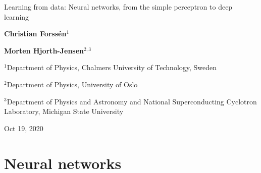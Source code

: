 \documentclass[%
oneside,                 %
final,                   %
10pt]{article}
\begin{document}

\newcommand{\exercisesection}[1]{\subsection*{#1}}







\thispagestyle{empty}

\begin{center}
{\LARGE\bf
\begin{spacing}{1.25}
Learning from data: Neural networks, from the simple perceptron to deep learning
\end{spacing}
}
\end{center}


\begin{center}
{\bf Christian Forssén${}^{1}$} \\ [0mm]
\end{center}


\begin{center}
{\bf Morten Hjorth-Jensen${}^{2, 3}$} \\ [0mm]
\end{center}

\begin{center}
\centerline{{\small ${}^1$Department of Physics, Chalmers University of Technology, Sweden}}
\centerline{{\small ${}^2$Department of Physics, University of Oslo}}
\centerline{{\small ${}^3$Department of Physics and Astronomy and National Superconducting Cyclotron Laboratory, Michigan State University}}
\end{center}
    

\begin{center}
Oct 19, 2020
\end{center}

\vspace{1cm}


\section{Neural networks}
\end{document}
